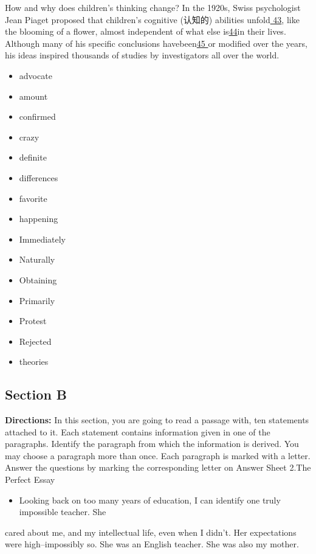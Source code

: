 \documentclass[UTF8,11pt]{ctexart}
\begin{document}
How and why does children's thinking change? In the 1920s, Swiss psychologist Jean Piaget proposed that children's cognitive (认知的) abilities unfold\uline{ 43}, like the blooming of a flower, almost independent of what else is\uline{44}in their lives. Although many of his specific conclusions havebeen\uline{45 }or modified over the years, his ideas inspired thousands of studies by investigators all over the world.


\begin{itemize}[leftmargin=2em,itemsep=.2em,topsep=.4em]\item[A.] advocate
\item[B.] amount
\item[C.] confirmed
\item[D.] crazy
\item[E.] definite
\item[F.] differences
\item[G.] favorite
\item[H.] happening
\item[I.] Immediately
\item[J.] Naturally
\item[K.] Obtaining
\item[L.] Primarily
\item[M.] Protest
\item[N.] Rejected
\item[O.] theories
\end{itemize}

\subsection*{\textbf{Section B}}


\textbf{Directions:} In this section, you are going to read a passage with, ten statements attached to it. Each statement contains information given in one of the paragraphs. Identify the paragraph from which the information is derived. You may choose a paragraph more than once. Each paragraph is marked with a letter. Answer the questions by marking the corresponding letter on Answer Sheet 2.The Perfect Essay


\begin{itemize}[leftmargin=2em,itemsep=.2em,topsep=.4em]\item[A.] Looking back on too many years of education, I can identify one truly impossible teacher. She
\end{itemize}

cared about me, and my intellectual life, even when I didn't. Her expectations were high--impossibly so. She was an English teacher. She was also my mother.
\end{document}
